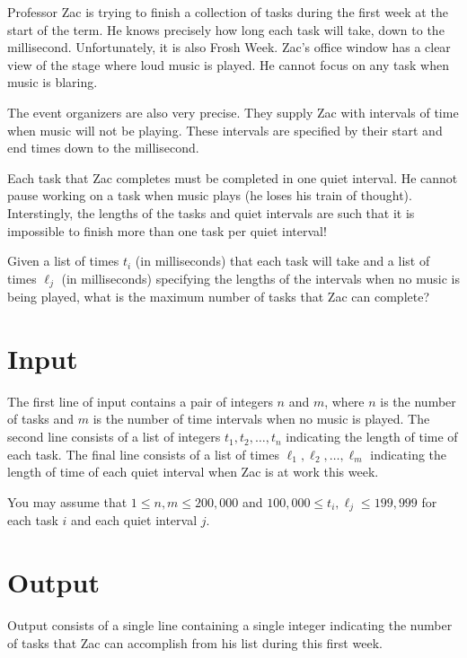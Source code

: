 
Professor Zac is trying to finish a collection of tasks during the first week
at the start of the term.
He knows precisely how long each task will take, down to the millisecond.
Unfortunately, it is also
Frosh Week. Zac's office window has a clear view of the stage where loud music
is played. He cannot focus on any task when music is blaring.

The event organizers are also very precise.  They supply Zac with intervals
of time when music will not be playing. These intervals are specified by
their start and end times down to the millisecond.

Each task that Zac completes must be completed in one quiet interval.
He cannot pause working on a task when music plays (he loses his train of
thought). Interstingly, the lengths of the tasks and quiet intervals are such
that it is impossible to finish more than one task per quiet interval!

Given a list of times $t_i$ (in milliseconds) that each task will take
and a list of times $\ell_j$ (in milliseconds) specifying the lengths of the
intervals when no music is being played, what is the maximum number of tasks
that Zac can complete?

\section*{Input} The first line of input contains a pair of integers $n$ 
and $m$, where $n$ is the number of tasks and $m$ is the number of time 
intervals when no music is played. The second line consists of a list of 
integers $t_1, t_2, \ldots, t_n$ indicating the length of time of each 
task. The final line consists of a list of times $\ell_1, \ell_2, 
\ldots, \ell_m$ indicating the length of time of each quiet interval 
when Zac is at work this week.

You may assume that $1 \leq n,m \leq 200,000$ and $100,000 \leq t_i, \ell_j \leq 199,999$
for each task $i$ and each quiet interval $j$.

\section*{Output}
Output consists of a single line containing a single integer indicating the
number of tasks that Zac can accomplish from his list during this first week.
